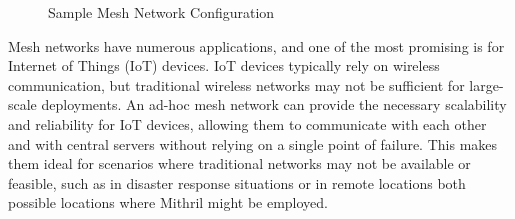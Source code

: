 \begin{figure}[H]
  \centering
  \caption{\label{Figure::Sample Mesh} Sample Mesh Network Configuration}
  \end{figure}

  Mesh networks have numerous applications, and one of the most promising is for Internet of Things (IoT) devices. IoT devices typically rely on wireless communication, but traditional wireless networks may not be sufficient for large-scale deployments. An ad-hoc mesh network can provide the necessary scalability and reliability for IoT devices, allowing them to communicate with each other and with central servers without relying on a single point of failure. This makes them ideal for scenarios where traditional networks may not be available or feasible, such as in disaster response situations or in remote locations both possible locations where Mithril might be employed.


